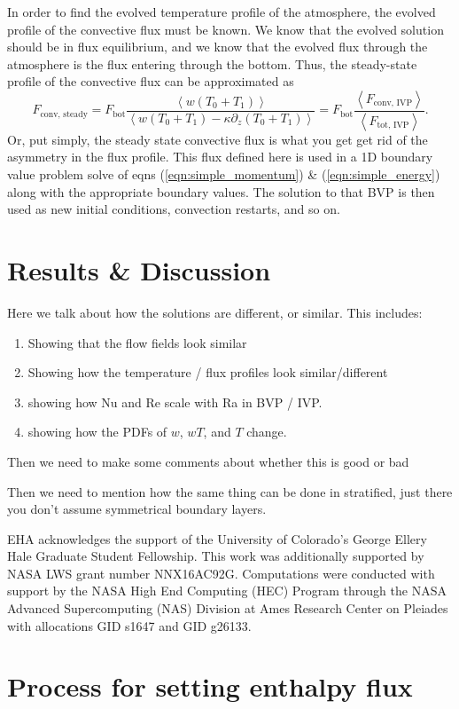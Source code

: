 \documentclass[aps, pre, onecolumn, nofootinbib, notitlepage, groupedaddress, amsfonts, amssymb, amsmath, longbibliography]{revtex4-1}
\newcommand{\angles}[1]{\ensuremath{\left\langle #1 \right\rangle}}
\begin{document}
In order to find the evolved temperature profile of the atmosphere, the evolved profile of the convective flux must
be known.  We know that the evolved solution should be in flux equilibrium, and we know that the evolved flux through
the atmosphere is the flux entering through the bottom.  Thus, the steady-state profile of the convective flux can be
approximated as
\begin{equation}
F_{\text{conv, steady}} = F_{\text{bot}}\frac{\angles{w(T_0 + T_1)}}{\angles{w(T_0 + T_1) - \kappa \partial_z (T_0 + T_1)}}
= F_{\text{bot}}\frac{\angles{F_{\text{conv, IVP}}}}{\angles{F_{\text{tot, IVP}}}}.
\end{equation}
Or, put simply, the steady state convective flux is what you get get rid of the asymmetry in the flux profile.
This flux defined here is used in a 1D boundary value problem solve of 
eqns (\ref{eqn:simple_momentum}) \& (\ref{eqn:simple_energy}) along with the appropriate boundary values.  The solution
to that BVP is then used as new initial conditions, convection restarts, and so on.


\section{Results \& Discussion}
\label{sec:results}
Here we talk about how the solutions are different, or similar.  This includes:
\begin{enumerate}
\item Showing that the flow fields look similar
\item Showing how the temperature / flux profiles look similar/different
\item showing how Nu and Re scale with Ra in BVP / IVP.
\item showing how the PDFs of $w$, $wT$, and $T$ change.
\end{enumerate}

Then we need to make some comments about whether this is good or bad

Then we need to mention how the same thing can be done in stratified, just there you don't
assume symmetrical boundary layers.





\begin{acknowledgments}
EHA acknowledges the support of the University of Colorado's George 
Ellery Hale Graduate Student Fellowship.
This work was additionally supported by  NASA LWS grant number NNX16AC92G.  
Computations were conducted 
with support by the NASA High End Computing (HEC) Program through the NASA 
Advanced Supercomputing (NAS) Division at Ames Research Center on Pleiades
with allocations GID s1647 and GID g26133.
\end{acknowledgments}


\appendix
\section{Process for setting enthalpy flux}



\end{document}
